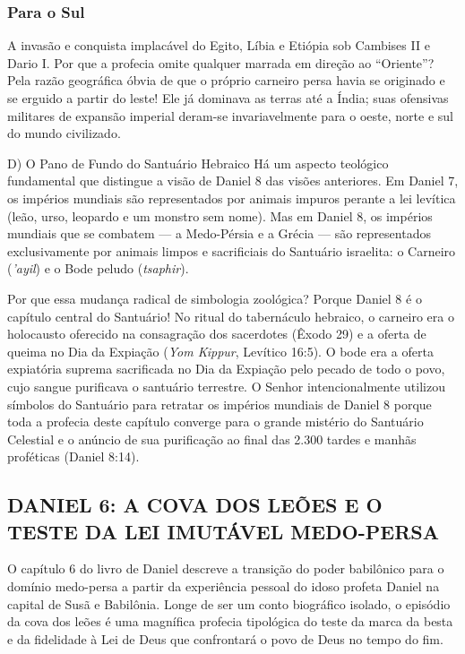 \documentclass[11pt,a4paper,openany]{book}
\begin{document}
\subsubsection*{Para o Sul}
A invasão e conquista implacável do Egito, Líbia e Etiópia sob Cambises II e Dario I.
Por que a profecia omite qualquer marrada em direção ao ``Oriente''? Pela razão geográfica óbvia de que o próprio carneiro persa havia se originado e se erguido a partir do leste! Ele já dominava as terras até a Índia; suas ofensivas militares de expansão imperial deram-se invariavelmente para o oeste, norte e sul do mundo civilizado.

D) O Pano de Fundo do Santuário Hebraico
Há um aspecto teológico fundamental que distingue a visão de Daniel 8 das visões anteriores. Em Daniel 7, os impérios mundiais são representados por animais impuros perante a lei levítica (leão, urso, leopardo e um monstro sem nome). Mas em Daniel 8, os impérios mundiais que se combatem — a Medo-Pérsia e a Grécia — são representados exclusivamente por animais limpos e sacrificiais do Santuário israelita: o Carneiro (\textit{'ayil}) e o Bode peludo (\textit{tsaphir}).

Por que essa mudança radical de simbologia zoológica?
Porque Daniel 8 é o capítulo central do Santuário! No ritual do tabernáculo hebraico, o carneiro era o holocausto oferecido na consagração dos sacerdotes (Êxodo 29) e a oferta de queima no Dia da Expiação (\textit{Yom Kippur}, Levítico 16:5). O bode era a oferta expiatória suprema sacrificada no Dia da Expiação pelo pecado de todo o povo, cujo sangue purificava o santuário terrestre. O Senhor intencionalmente utilizou símbolos do Santuário para retratar os impérios mundiais de Daniel 8 porque toda a profecia deste capítulo converge para o grande mistério do Santuário Celestial e o anúncio de sua purificação ao final das 2.300 tardes e manhãs proféticas (Daniel 8:14).



\subsection{DANIEL 6: A COVA DOS LEÕES E O TESTE DA LEI IMUTÁVEL MEDO-PERSA}


O capítulo 6 do livro de Daniel descreve a transição do poder babilônico para o domínio medo-persa a partir da experiência pessoal do idoso profeta Daniel na capital de Susã e Babilônia. Longe de ser um conto biográfico isolado, o episódio da cova dos leões é uma magnífica profecia tipológica do teste da marca da besta e da fidelidade à Lei de Deus que confrontará o povo de Deus no tempo do fim.
\end{document}
